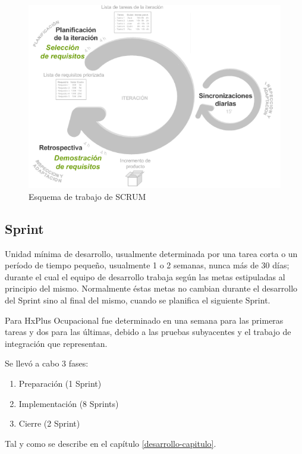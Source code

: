     \begin{figure}[htbp!]
        \begin{center}
            \includegraphics[width=.8\textwidth]{figures/scrum}
        \end{center}
        \caption{Esquema de trabajo de SCRUM}
        \label{scrum-esquema}
    \end{figure}
    
        \subsection{Sprint}
        
        Unidad mínima de desarrollo, usualmente determinada por una tarea corta o un período de tiempo pequeño, usualmente 1 o 2 semanas, nunca más de 30 días; durante el cual el equipo de desarrollo trabaja según las metas estipuladas al principio del mismo. Normalmente éstas metas no cambian durante el desarrollo del Sprint sino al final del mismo, cuando se planifica el siguiente Sprint.
        
        Para HxPlus Ocupacional fue determinado en una semana para las primeras tareas y dos para las últimas, debido a las pruebas subyacentes y el trabajo de integración que representan.
        
        Se llevó a cabo 3 fases:
        \begin{enumerate}
            \item Preparación (1 Sprint)
            \item Implementación (8 Sprints)
            \item Cierre (2 Sprint)
        \end{enumerate}
        
        Tal y como se describe en el capítulo \ref{desarrollo-capitulo}.
        

